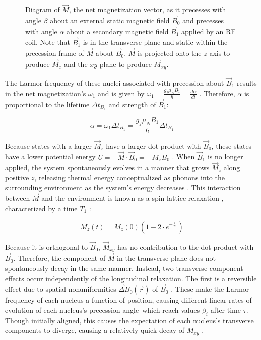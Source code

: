 \documentclass[11pt]{article}
\begin{document}
\begin{figure}[H]
  \caption{Diagram of $\vec M$, the net magnetization vector, as it
    precesses with angle $\beta$ about an external static magnetic field
    $\vec B_0$ and precesses with angle $\alpha$ about a secondary
    magnetic field $\vec B_1$ applied by an
    RF coil. Note that $\vec B_1$ is in the transverse plane and static
    within the precession frame of $\vec M$ about $\vec B_0$. $\vec
    M$ is projected onto the $z$ axis to produce
  $\vec M_z$ and the $xy$ plane to produce $\vec M_{xy}$.}
  \label{fig:dipole_angular_momentum_3d}
\end{figure}

The Larmor frequency
of these nuclei associated with precession about $\vec B_1$ results in the net
magnetization's $\omega_1$ and is given by $\omega_1 =
\frac{g_f \mu_N B_1}{\hbar} = \frac{d\alpha}{dt}$ \cite{sakurai,
harris, mel}. Therefore, $\alpha$ is
proportional to the lifetime $\Delta t_{B_1}$ and strength of $\vec B_1$:

\begin{equation}
  \alpha = \omega_1 \Delta t_{B_1} = \frac{g_f \mu_N B_1}{\hbar}
  \Delta t_{B_1}
  \label{eq:alpha}
\end{equation}

Because states with a larger $\vec M_z$ have a larger dot product
with $\vec B_0$, these states have a lower potential energy $U = -
\vec M \cdot \vec B_0 = - M_z B_0$ \cite{knight, young}. When $\vec B_1$ is no
longer applied, the system spontaneously
evolves in a manner that grows $\vec M_z$ along positive $z$, releasing
thermal energy
conceptualized as phonons
into the surrounding environment as the system's energy decreases \cite{kittel,
ashcroft_mermin}. This
interaction between $\vec M$
and the environment is
known as a spin-lattice relaxation \cite{mel}, characterized by a time
$T_1$ \cite{mel}:

\begin{equation}
  M_z(t) = M_z(0) \left(1 - 2 \cdot e^{- \frac{t}{T_1}} \right)
  \label{eq:spin_lattice_relaxation}
\end{equation}

Because it is orthogonal to $\vec B_0$, $\vec M_{xy}$ has no contribution to the
dot product with $\vec B_0$. Therefore, the component of $\vec M$ in
the transverse plane does not spontaneously decay in the same manner.
Instead, two transverse-component effects occur independently of the
longitudinal relaxation. The first is a reversible effect due to
spatial nonuniformities $\vec \Delta B_0(\vec r)$ of $\vec B_0$
\cite{mel}. These
make the Larmor frequency of each nucleus a function of position, causing
different linear rates of evolution of each nucleus's precession
angle--which reach values $\beta_i$ after time $\tau$. Though
initially aligned, this
causes the expectation of each nucleus's transverse components to
diverge, causing a relatively quick decay of $M_{xy}$ \cite{mel}.
\end{document}
